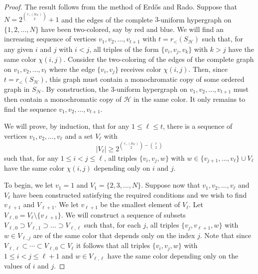 \documentclass[11pt]{article}
\newcommand{\rord}{r_{<}}
\begin{document}
\begin{proof}
The result follows from the method of Erd\H{o}s and Rado. Suppose that $N = 2^{\binom{\rord(S_\mathcal{H})}{2}}+1$ and the edges of the complete $3$-uniform hypergraph on $\{1, 2, \dots, N\}$ have been two-colored, say by red and blue. We will find an increasing sequence of vertices $v_1, v_2, \dots, v_{t+1}$ with $t = \rord(S_\mathcal{H})$ such that, for any given $i$ and $j$ with $i < j$, all triples of the form $\{v_i, v_j, v_k\}$ with $k > j$ have the same color $\chi(i, j)$. Consider the two-coloring of the edges of the complete graph on $v_1, v_2, \dots, v_t$ where the edge $\{v_i,v_j\}$ receives color $\chi(i, j)$. Then, since $t = \rord(S_\mathcal{H})$, this graph must contain a monochromatic copy of some ordered graph in $S_\mathcal{H}$. By construction, the $3$-uniform hypergraph on $v_1, v_2, \dots, v_{t + 1}$ must then contain a monochromatic copy of $\mathcal{H}$ in the same color. It only remains to find the sequence $v_1, v_2, \dots, v_{t + 1}$.

We will prove, by induction, that for any $1 \leq \ell \leq t$, there is a sequence of vertices $v_1, v_2, \dots, v_{\ell}$ and a set $V_{\ell}$ with 
\[|V_\ell| \geq 2^{\binom{\rord(S_\mathcal{H})}{2} - \binom{\ell}{2}}\] 
such that, for any $1 \leq i < j \leq \ell$, all triples $\{v_i, v_j, w\}$ with 
$w \in \{v_{j+1}, \ldots, v_{\ell}\} \cup V_\ell$ have the same color $\chi(i, j)$ depending only on $i$ and $j$. 

To begin, we let $v_1 = 1$ and $V_1 = \{2, 3, \dots, N\}$. Suppose now that $v_1, v_2, \dots, v_{\ell}$ and $V_{\ell}$ have been constructed satisfying the required conditions and we wish to find $v_{\ell + 1}$ and $V_{\ell + 1}$. We let $v_{\ell + 1}$ be the smallest element of $V_{\ell}$. Let $V_{\ell, 0} = V_{\ell} \setminus \{v_{\ell + 1}\}$. We will construct a sequence of subsets $V_{\ell,0} \supset V_{\ell, 1} \supset \dots \supset V_{\ell, \ell}$ such that, for each $j$, all triples $\{v_j, v_{\ell + 1}, w\}$ with $w \in V_{\ell, j}$ are of the same color that depends only on the index $j$.
Note that since $V_{\ell, \ell} \subset \cdots \subset V_{\ell,0} \subset V_{\ell}$ it follows that all triples $\{v_i, v_j, w\}$ with $1 \leq i < j \leq \ell+1$ and $w \in V_{\ell, \ell}$ have the same color depending only on the values of $i$ and $j$.


\end{proof}
\end{document}

